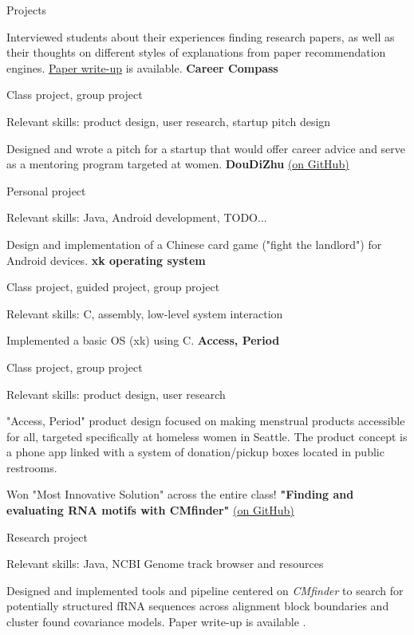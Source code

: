 \begin{rubric}{Projects}
	\par Interviewed students about their experiences finding research papers, as well as their thoughts on different styles of explanations from paper recommendation engines. \href{https://github.com/cephcyn/cephcyn.github.io/raw/master/documents/u_cse510/final_ContextExpl.pdf}{Paper write-up} is available.
\entry*[2020] %
	\textbf{Career Compass} %
	\par Class project, group project
	\par Relevant skills: product design, user research, startup pitch design
	\par Designed and wrote a pitch for a startup that would offer career advice and serve as a mentoring program targeted at women.
\entry*[2019] %
	\textbf{DouDiZhu} \href{https://github.com/cephcyn/DouDiZhu}{(on GitHub)}
	\par Personal project
	\par Relevant skills: Java, Android development, TODO...
	\par Design and implementation of a Chinese card game ("fight the landlord") for Android devices. %
\entry*[2019] %
	\textbf{xk operating system} %
	\par Class project, guided project, group project
	\par Relevant skills: C, assembly, low-level system interaction
	\par Implemented a basic OS (xk) using C. %
\entry*[2019] %
	\textbf{Access, Period} %
	\par Class project, group project
	\par Relevant skills: product design, user research
	\par "Access, Period" product design focused on making menstrual products accessible for all, targeted specifically at homeless women in Seattle. The product concept is a phone app linked with a system of donation/pickup boxes located in public restrooms.
	\par Won "Most Innovative Solution" across the entire class!
\entry*[2019] %
	\textbf{"Finding and evaluating RNA motifs with CMfinder"} \href{https://github.com/cephcyn/jcmf}{(on GitHub)}
	\par Research project
	\par Relevant skills: Java, NCBI Genome track browser and resources
	\par Designed and implemented tools and pipeline centered on \textit{CMfinder} to search for potentially structured fRNA sequences across alignment block boundaries and cluster found covariance models. Paper write-up is available \cite{zhou2019thesis}.

\end{rubric}
